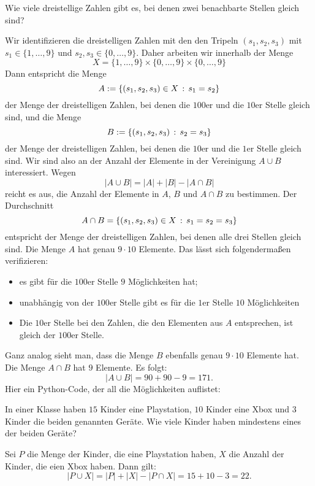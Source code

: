 \begin{bsp}
	Wie viele dreistellige Zahlen gibt es, bei denen zwei benachbarte Stellen gleich sind? 
	
	Wir identifizieren die dreistelligen Zahlen mit den  den Tripeln $(s_1,s_2,s_3)$ mit $s_1 \in \{1,\ldots,9\}$ und $s_2,s_3 \in \{0,\ldots,9\}$. Daher arbeiten wir innerhalb der Menge
	\[
			X = \{1,\ldots,9\} \times  \{0,\ldots,9\} \times \{0,\ldots,9\}
	\]
	Dann entspricht die Menge 
	\[
		A := \left\{  (s_1,s_2,s_3) \in X \,:\, s_1=s_2 \right\}
	\]
	der Menge der dreistelligen Zahlen, bei denen die $100$er und die $10$er Stelle gleich sind, und die Menge
	\[
		B:= \left\{  (s_1,s_2,s_3) \,:\, s_2=s_3 \right\}
	\]
	der Menge der dreistelligen Zahlen, bei denen die $10$er und die $1$er Stelle gleich sind. Wir sind also an der Anzahl der Elemente in der Vereinigung $A \cup B$ interessiert. Wegen 
	\[
			| A \cup B| = |A| + |B|  - |A \cap B|
	\]
	reicht es aus, die Anzahl der Elemente in $A$, $B$ und $A \cap B$ zu bestimmen. 	
	Der Durchschnitt 
	\[	
		A \cap B = \left\{  (s_1,s_2,s_3) \in X \,:\, s_1=s_2=s_3 \right\}
	\]
	entspricht der Menge der dreistelligen Zahlen, bei denen alle drei Stellen gleich sind. Die Menge $A$ hat genau $9 \cdot 10$ Elemente. Das lässt sich folgendermaßen verifizieren:  
	\begin{itemize} 
		\item es gibt für die $100$er Stelle $9$ Möglichkeiten hat;
		\item unabhängig von der $100$er Stelle gibt es für die $1$er Stelle $10$ Möglichkeiten
		\item Die $10$er Stelle bei den Zahlen, die den Elementen aus $A$ entsprechen, ist gleich der $100$er Stelle. 
	\end{itemize} 
	Ganz analog sieht man, dass die Menge $B$ ebenfalls genau $9 \cdot 10$ Elemente hat. Die Menge $A\cap B$ hat $9$ Elemente. Es folgt: 
	\[
		|A \cup B| = 90 + 90 - 9 = 171. 
	\]	
	Hier ein Python-Code, der all die Möglichkeiten auflistet: 
	
\end{bsp} 


\begin{bsp}
	In einer Klasse haben $15$ Kinder eine Playstation, $10$ Kinder eine Xbox und $3$ Kinder die beiden genannten Geräte. Wie viele Kinder haben mindestens eines der beiden Geräte? 
	
	Sei $P$ die Menge der Kinder, die eine Playstation haben, $X$ die Anzahl der Kinder, die eien Xbox haben. Dann gilt: 
	\[
		|P \cup X| = |P| + |X| - |P \cap X| = 15 + 10 - 3 = 22. 
	\]
\end{bsp} 

